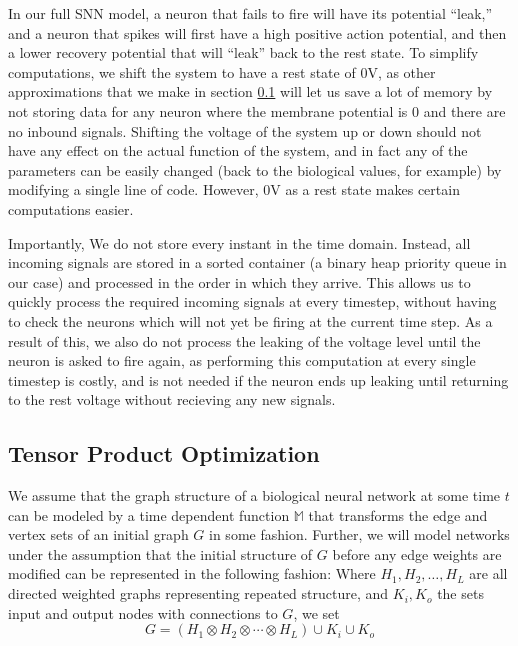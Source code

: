 \documentclass{article}
\newcommand{\M}{\mathbb{M}}
\begin{document}
In our full SNN model, a neuron that fails to fire will have its potential ``leak,'' and a neuron that spikes will first have a high positive action potential, and then a lower recovery potential that will ``leak'' back to the rest state. To simplify computations, we shift the system to have a rest state of 0V, as other approximations that we make in section \ref{TPO} will let us save a lot of memory by not storing data for any neuron where the membrane potential is 0 and there are no inbound signals. Shifting the voltage of the system up or down  should not have any effect on the actual function of the system, and in fact any of the parameters can be easily changed (back to the biological values, for example) by modifying a single line of code. However, 0V as a rest state makes certain computations easier.

Importantly, We do not store every instant in the time domain. Instead, all incoming signals are stored in a sorted container (a binary heap priority queue in our case) and processed in the order in which they arrive. This allows us to quickly process the required incoming signals at every timestep, without having to check the neurons which will not yet be firing at the current time step. As a result of this, we also do not process the leaking of the voltage level until the neuron is asked to fire again, as performing this computation at every single timestep is costly, and is not needed if the neuron ends up leaking until returning to the rest voltage without recieving any new signals.


\subsection{Tensor Product Optimization} \label{TPO}

We assume that the graph structure of a biological neural network at some time $t$ can be modeled by a time dependent function $\M$ that transforms the edge and vertex sets of an initial graph $G$ in some fashion. Further, we will model networks under the assumption that the initial structure of $G$ before any edge weights are modified can be represented in the following fashion:
Where $H_1, H_2, \ldots, H_L$ are all directed weighted graphs representing repeated structure, and $K_i , K_o$ the sets input and output nodes with connections to $G$, we set  
$$ G = (H_1 \otimes H_2 \otimes \cdots \otimes H_L) \cup K_i \cup K_o $$
\end{document}
